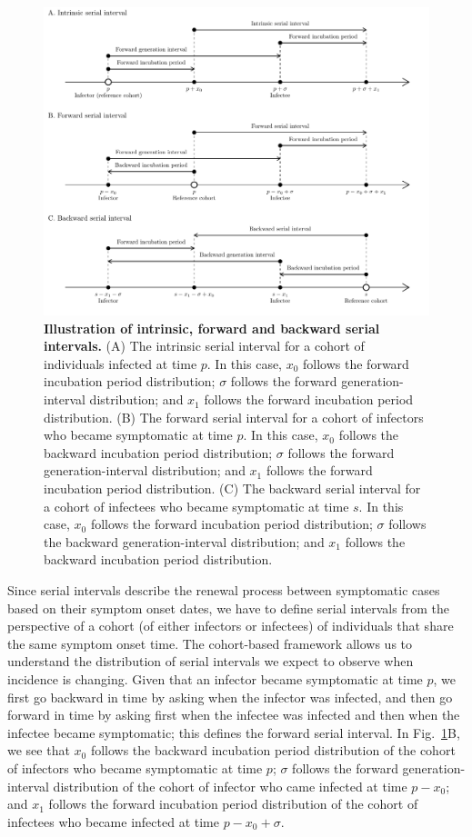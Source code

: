 \documentclass[12pt]{article}
\newcommand{\fref}[1]{Fig.~\ref{fig:#1}}
\newcommand{\pt}{p} %
\newcommand{\st}{s} %
\newcommand{\gtime}{\sigma} %
\begin{document}
\begin{figure}[!th]
\includegraphics[width=\textwidth]{serial_guide.pdf}
\caption{
\textbf{Illustration of intrinsic, forward and backward serial intervals.}
(A) The intrinsic serial interval for a cohort of individuals infected at time $\pt$.
In this case, $x_0$ follows the forward incubation period distribution;
$\gtime$ follows the forward generation-interval distribution;
and $x_1$ follows the forward incubation period distribution.
(B) The forward serial interval for a cohort of infectors who became symptomatic at time $\pt$.
In this case, $x_0$ follows the backward incubation period distribution;
$\gtime$ follows the forward generation-interval distribution;
and $x_1$ follows the forward incubation period distribution.
(C) The backward serial interval for a cohort of infectees who became symptomatic at time $\st$.
In this case, $x_0$ follows the forward incubation period distribution;
$\gtime$ follows the backward generation-interval distribution;
and $x_1$ follows the backward incubation period distribution.
}
\label{fig:diagram}
\end{figure}

Since serial intervals describe the renewal process between symptomatic cases based on their symptom onset dates, we have to define serial intervals from the perspective of a cohort (of either infectors or infectees) of individuals that share the same symptom onset time.
The cohort-based framework allows us to understand the distribution of serial intervals we expect to observe when incidence is changing.
Given that an infector became symptomatic at time $\pt$, we first go backward in time by asking when the infector was infected, and then go forward in time by asking first when the infectee was infected and then when the infectee became symptomatic;
this defines the forward serial interval.
In \fref{diagram}B, we see that $x_0$ follows the backward incubation period distribution of the cohort of infectors who became symptomatic at time $\pt$;
$\gtime$ follows the forward generation-interval distribution of the cohort of infector who came infected at time $\pt - x_0$;
and $x_1$ follows the forward incubation period distribution of the cohort of infectees who became infected at time $\pt - x_0 + \gtime$.
\end{document}
